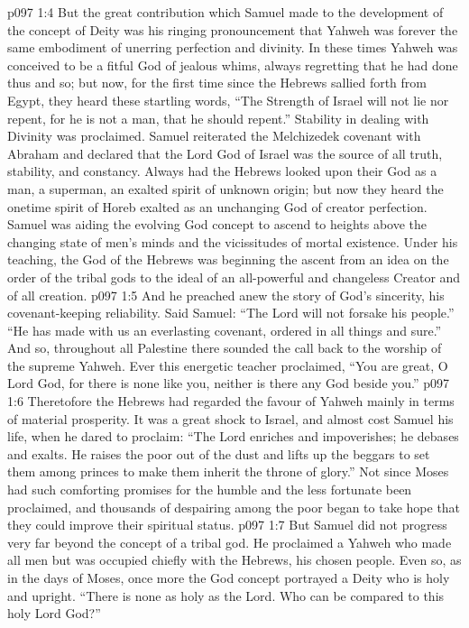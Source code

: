 \vs p097 1:4 But the great contribution which Samuel made to the development of the concept of Deity was his ringing pronouncement that Yahweh was  forever the same embodiment of unerring perfection and divinity. In these times Yahweh was conceived to be a fitful God of jealous whims, always regretting that he had done thus and so; but now, for the first time since the Hebrews sallied forth from Egypt, they heard these startling words, “The Strength of Israel will not lie nor repent, for he is not a man, that he should repent.” Stability in dealing with Divinity was proclaimed. Samuel reiterated the Melchizedek covenant with Abraham and declared that the Lord God of Israel was the source of all truth, stability, and constancy. Always had the Hebrews looked upon their God as a man, a superman, an exalted spirit of unknown origin; but now they heard the onetime spirit of Horeb exalted as an unchanging God of creator perfection. Samuel was aiding the evolving God concept to ascend to heights above the changing state of men’s minds and the vicissitudes of mortal existence. Under his teaching, the God of the Hebrews was beginning the ascent from an idea on the order of the tribal gods to the ideal of an all\hyp{}powerful and changeless Creator and  of all creation.
\vs p097 1:5 And he preached anew the story of God’s sincerity, his covenant\hyp{}keeping reliability. Said Samuel: “The Lord will not forsake his people.” “He has made with us an everlasting covenant, ordered in all things and sure.” And so, throughout all Palestine there sounded the call back to the worship of the supreme Yahweh. Ever this energetic teacher proclaimed, “You are great, O Lord God, for there is none like you, neither is there any God beside you.”
\vs p097 1:6 \pc Theretofore the Hebrews had regarded the favour of Yahweh mainly in terms of material prosperity. It was a great shock to Israel, and almost cost Samuel his life, when he dared to proclaim: “The Lord enriches and impoverishes; he debases and exalts. He raises the poor out of the dust and lifts up the beggars to set them among princes to make them inherit the throne of glory.” Not since Moses had such comforting promises for the humble and the less fortunate been proclaimed, and thousands of despairing among the poor began to take hope that they could improve their spiritual status.
\vs p097 1:7 But Samuel did not progress very far beyond the concept of a tribal god. He proclaimed a Yahweh who made all men but was occupied chiefly with the Hebrews, his chosen people. Even so, as in the days of Moses, once more the God concept portrayed a Deity who is holy and upright. “There is none as holy as the Lord. Who can be compared to this holy Lord God?”
